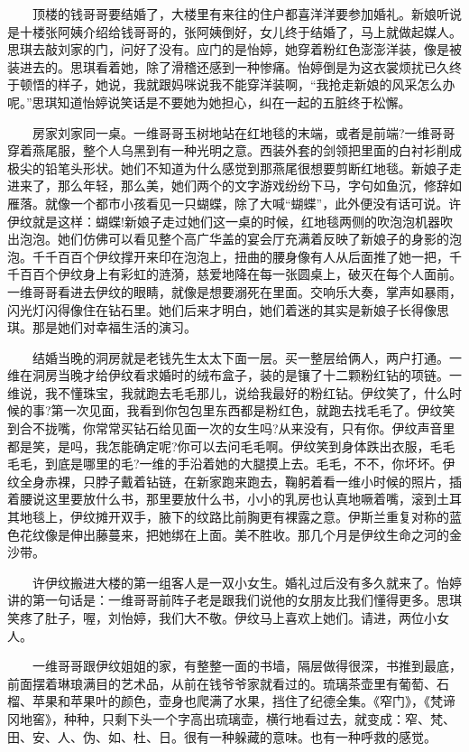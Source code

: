 \documentclass[12pt,UTF8]{ctexbook}
\begin{document}
　　顶楼的钱哥哥要结婚了，大楼里有来往的住户都喜洋洋要参加婚礼。新娘听说是十楼张阿姨介绍给钱哥哥的，张阿姨倒好，女儿终于结婚了，马上就做起媒人。思琪去敲刘家的门，问好了没有。应门的是怡婷，她穿着粉红色澎澎洋装，像是被装进去的。思琪看着她，除了滑稽还感到一种惨痛。怡婷倒是为这衣裳烦扰已久终于顿悟的样子，她说，我就跟妈咪说我不能穿洋装啊，\enquote{我抢走新娘的风采怎么办呢。}思琪知道怡婷说笑话是不要她为她担心，纠在一起的五脏终于松懈。

　　房家刘家同一桌。一维哥哥玉树地站在红地毯的末端，或者是前端?一维哥哥穿着燕尾服，整个人乌黑到有一种光明之意。西装外套的剑领把里面的白衬衫削成极尖的铅笔头形状。她们不知道为什么感觉到那燕尾很想要剪断红地毯。新娘子走进来了，那么年轻，那么美，她们两个的文字游戏纷纷下马，字句如鱼沉，修辞如雁落。就像一个都市小孩看见一只蝴蝶，除了大喊\enquote{蝴蝶}，此外便没有话可说。许伊纹就是这样：蝴蝶!新娘子走过她们这一桌的时候，红地毯两侧的吹泡泡机器吹出泡泡。她们仿佛可以看见整个高广华盖的宴会厅充满着反映了新娘子的身影的泡泡。千千百百个伊纹撑开来印在泡泡上，扭曲的腰身像有人从后面推了她一把，千千百百个伊纹身上有彩虹的涟漪，慈爱地降在每一张圆桌上，破灭在每个人面前。一维哥哥看进去伊纹的眼睛，就像是想要溺死在里面。交响乐大奏，掌声如暴雨，闪光灯闪得像住在钻石里。她们后来才明白，她们着迷的其实是新娘子长得像思琪。那是她们对幸福生活的演习。

　　结婚当晚的洞房就是老钱先生太太下面一层。买一整层给俩人，两户打通。一维在洞房当晚才给伊纹看求婚时的绒布盒子，装的是镶了十二颗粉红钻的项链。一维说，我不懂珠宝，我就跑去毛毛那儿，说给我最好的粉红钻。伊纹笑了，什么时候的事?第一次见面，我看到你包包里东西都是粉红色，就跑去找毛毛了。伊纹笑到合不拢嘴，你常常买钻石给见面一次的女生吗?从来没有，只有你。伊纹声音里都是笑，是吗，我怎能确定呢?你可以去问毛毛啊。伊纹笑到身体跌出衣服，毛毛毛毛，到底是哪里的毛?一维的手沿着她的大腿摸上去。毛毛，不不，你坏坏。伊纹全身赤裸，只脖子戴着钻链，在新家跑来跑去，鞠躬着看一维小时候的照片，插着腰说这里要放什么书，那里要放什么书，小小的乳房也认真地噘着嘴，滚到土耳其地毯上，伊纹摊开双手，腋下的纹路比前胸更有裸露之意。伊斯兰重复对称的蓝色花纹像是伸出藤蔓来，把她绑在上面。美不胜收。那几个月是伊纹生命之河的金沙带。

　　许伊纹搬进大楼的第一组客人是一双小女生。婚礼过后没有多久就来了。怡婷讲的第一句话是：一维哥哥前阵子老是跟我们说他的女朋友比我们懂得更多。思琪笑疼了肚子，喔，刘怡婷，我们大不敬。伊纹马上喜欢上她们。请进，两位小女人。

　　一维哥哥跟伊纹姐姐的家，有整整一面的书墙，隔层做得很深，书推到最底，前面摆着琳琅满目的艺术品，从前在钱爷爷家就看过的。琉璃茶壶里有葡萄、石榴、苹果和苹果叶的颜色，壶身也爬满了水果，挡住了纪德全集。《窄门》，《梵谛冈地窖》，种种，只剩下头一个字高出琉璃壶，横行地看过去，就变成：窄、梵、田、安、人、伪、如、杜、日。很有一种躲藏的意味。也有一种呼救的感觉。
\end{document}
